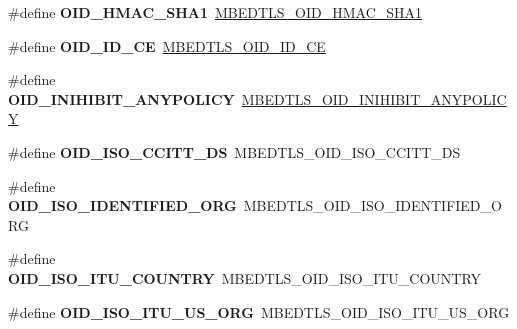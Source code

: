 \begin{DoxyCompactItemize}
\item 
\mbox{\label{compat-1_83_8h_a19882735a6d173483d77abef29d4541e}} 
\#define {\bfseries O\+I\+D\+\_\+\+H\+M\+A\+C\+\_\+\+S\+H\+A1}~\mbox{\hyperlink{oid_8h_a88c68fe32598265ec347783e0d8fb81d}{M\+B\+E\+D\+T\+L\+S\+\_\+\+O\+I\+D\+\_\+\+H\+M\+A\+C\+\_\+\+S\+H\+A1}}
\item 
\mbox{\label{compat-1_83_8h_ade05dbc72fd692bfd867530c95fdd57e}} 
\#define {\bfseries O\+I\+D\+\_\+\+I\+D\+\_\+\+CE}~\mbox{\hyperlink{oid_8h_a45d181b92d2b42398cd8090214ab7548}{M\+B\+E\+D\+T\+L\+S\+\_\+\+O\+I\+D\+\_\+\+I\+D\+\_\+\+CE}}
\item 
\mbox{\label{compat-1_83_8h_aa34a6059687df1a4608a825799516e0c}} 
\#define {\bfseries O\+I\+D\+\_\+\+I\+N\+I\+H\+I\+B\+I\+T\+\_\+\+A\+N\+Y\+P\+O\+L\+I\+CY}~\mbox{\hyperlink{oid_8h_aea885904f5b5556d40b40e8cdea4aabf}{M\+B\+E\+D\+T\+L\+S\+\_\+\+O\+I\+D\+\_\+\+I\+N\+I\+H\+I\+B\+I\+T\+\_\+\+A\+N\+Y\+P\+O\+L\+I\+CY}}
\item 
\mbox{\label{compat-1_83_8h_a808ab56c59c6d3873ab81f18af7c9e03}} 
\#define {\bfseries O\+I\+D\+\_\+\+I\+S\+O\+\_\+\+C\+C\+I\+T\+T\+\_\+\+DS}~M\+B\+E\+D\+T\+L\+S\+\_\+\+O\+I\+D\+\_\+\+I\+S\+O\+\_\+\+C\+C\+I\+T\+T\+\_\+\+DS
\item 
\mbox{\label{compat-1_83_8h_a6b6756e93042d2732d1531e24530b350}} 
\#define {\bfseries O\+I\+D\+\_\+\+I\+S\+O\+\_\+\+I\+D\+E\+N\+T\+I\+F\+I\+E\+D\+\_\+\+O\+RG}~M\+B\+E\+D\+T\+L\+S\+\_\+\+O\+I\+D\+\_\+\+I\+S\+O\+\_\+\+I\+D\+E\+N\+T\+I\+F\+I\+E\+D\+\_\+\+O\+RG
\item 
\mbox{\label{compat-1_83_8h_a4ca9af47144a961306ecb4abc9b69f52}} 
\#define {\bfseries O\+I\+D\+\_\+\+I\+S\+O\+\_\+\+I\+T\+U\+\_\+\+C\+O\+U\+N\+T\+RY}~M\+B\+E\+D\+T\+L\+S\+\_\+\+O\+I\+D\+\_\+\+I\+S\+O\+\_\+\+I\+T\+U\+\_\+\+C\+O\+U\+N\+T\+RY
\item 
\mbox{\label{compat-1_83_8h_ae58efad2f780dc751fb2e1b5d9ee6c8d}} 
\#define {\bfseries O\+I\+D\+\_\+\+I\+S\+O\+\_\+\+I\+T\+U\+\_\+\+U\+S\+\_\+\+O\+RG}~M\+B\+E\+D\+T\+L\+S\+\_\+\+O\+I\+D\+\_\+\+I\+S\+O\+\_\+\+I\+T\+U\+\_\+\+U\+S\+\_\+\+O\+RG
\item 
\mbox{\label{compat-1_83_8h_a43449224983a1f2892271cdd5eb6f6ef}} 

\end{DoxyCompactItemize}
